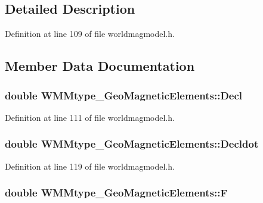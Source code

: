 \subsection{\-Detailed \-Description}


\-Definition at line 109 of file worldmagmodel.\-h.



\subsection{\-Member \-Data \-Documentation}
\hypertarget{struct_w_m_mtype___geo_magnetic_elements_a683f5cce0a61ae941ac21ac3245b590a}{
\subsubsection[{\-Decl}]{\setlength{\rightskip}{0pt plus 5cm}double {\bf \-W\-M\-Mtype\-\_\-\-Geo\-Magnetic\-Elements\-::\-Decl}}}\label{struct_w_m_mtype___geo_magnetic_elements_a683f5cce0a61ae941ac21ac3245b590a}


\-Definition at line 111 of file worldmagmodel.\-h.

\hypertarget{struct_w_m_mtype___geo_magnetic_elements_ac37defec32ce23551b0d787961d5e615}{
\subsubsection[{\-Decldot}]{\setlength{\rightskip}{0pt plus 5cm}double {\bf \-W\-M\-Mtype\-\_\-\-Geo\-Magnetic\-Elements\-::\-Decldot}}}\label{struct_w_m_mtype___geo_magnetic_elements_ac37defec32ce23551b0d787961d5e615}


\-Definition at line 119 of file worldmagmodel.\-h.

\hypertarget{struct_w_m_mtype___geo_magnetic_elements_a4c99b8d3e3432fca01948041425f1123}{
\subsubsection[{\-F}]{\setlength{\rightskip}{0pt plus 5cm}double {\bf \-W\-M\-Mtype\-\_\-\-Geo\-Magnetic\-Elements\-::\-F}}}\label{struct_w_m_mtype___geo_magnetic_elements_a4c99b8d3e3432fca01948041425f1123}


